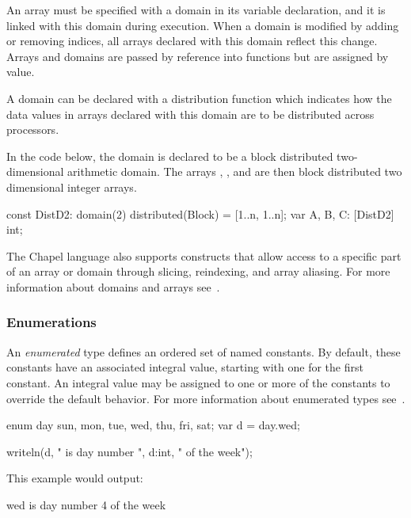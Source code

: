 An array must be specified with a domain in its variable declaration,
and it is linked with this domain during execution.  When a domain is
modified by adding or removing indices, all arrays declared with this
domain reflect this change.  Arrays and domains are passed by
reference into functions but are assigned by value.

A domain can be declared with a distribution function which indicates
how the data values in arrays declared with this domain are to be
distributed across processors.

\begin{example}
In the code below, the domain  is declared to be a 
block distributed two-dimensional arithmetic domain.
The arrays , , and  are then block distributed
two dimensional integer arrays.
\begin{chapel}
const DistD2: domain(2) distributed(Block) = [1..n, 1..n];
var A, B, C: [DistD2] int;
\end{chapel}
\end{example}

The Chapel language also supports constructs that allow 
access to a specific part of an array or domain through slicing,
reindexing, and array aliasing.   For more information about 
domains and arrays see~.
 
\subsubsection{Enumerations}
An \emph{enumerated} type defines an ordered set of named constants.
By default, these constants have an associated 
integral value, starting with one for the first constant. 
An integral value may be assigned to one or more of the constants
to override the default behavior.  For more information about
enumerated types see~.

\begin{example}
\begin{chapel}
enum day {sun, mon, tue, wed, thu, fri, sat};
var d = day.wed;

writeln(d, " is day number ", d:int, " of the week");
\end{chapel}

This example would output:
\begin{commandline}
wed is day number 4 of the week
\end{commandline}
\end{example}

